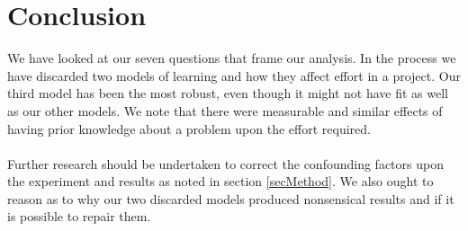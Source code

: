 \section{Conclusion} \label{secConclusion}

We have looked at our seven questions that frame our analysis.
In the process we have discarded two models of learning and how they affect
effort in a project.
Our third model has been the most robust, even though it might not have fit as
well as our other models.
We note that there were measurable and similar effects of having prior
knowledge about a problem upon the effort required.\\
\\
Further research should be undertaken to correct the confounding factors upon
the experiment and results as noted in section \ref{secMethod}.
We also ought to reason as to why our two discarded models produced nonsensical
results and if it is possible to repair them.
